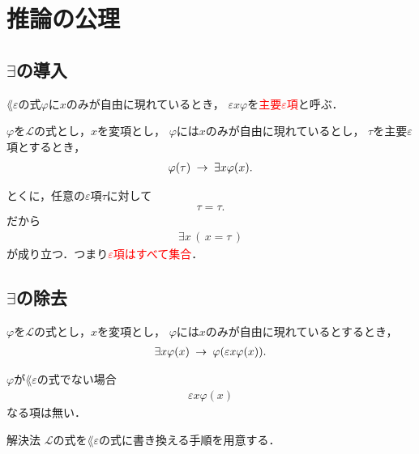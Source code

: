 \section{推論の公理}
\subsection{$\exists$の導入}
	$\lang{\varepsilon}$の式$\varphi$に$x$のみが自由に現れているとき，
	$\varepsilon x \varphi$を\textcolor{red}{主要$\varepsilon$項}と呼ぶ．
	
	\begin{screen}
		\begin{logicalaxm}
			$\varphi$を$\mathcal{L}$の式とし，$x$を変項とし，
			$\varphi$には$x$のみが自由に現れているとし，
			$\tau$を主要$\varepsilon$項とするとき，
			\begin{align}
				\varphi(\tau) \hspace{0.25em}\rightarrow\hspace{0.25em} \exists x \varphi(x).
			\end{align}
		\end{logicalaxm}
	\end{screen}
	
	とくに，任意の$\varepsilon$項$\tau$に対して
	\begin{align}
		\tau = \tau.
	\end{align}
	だから
	\begin{align}
		\exists x\, (\, x = \tau\, )
	\end{align}
	が成り立つ．つまり\textcolor{red}{$\varepsilon$項はすべて集合}．
	
\newpage
\subsection{$\exists$の除去}
	\begin{screen}
		\begin{logicalaxm}
			$\varphi$を$\mathcal{L}$の式とし，$x$を変項とし，
			$\varphi$には$x$のみが自由に現れているとするとき，
			\begin{align}
				\exists x \varphi(x) \hspace{0.25em}\rightarrow\hspace{0.25em} \varphi(\varepsilon x \varphi(x)).
			\end{align}
		\end{logicalaxm}
	\end{screen}
	
	$\varphi$が$\lang{\varepsilon}$の式でない場合
	\begin{align}
		\varepsilon x \varphi(x)
	\end{align}
	なる項は無い．
	
	\begin{itembox}[l]{解決法}
		$\mathcal{L}$の式を$\lang{\varepsilon}$の式に書き換える手順を用意する．
	\end{itembox}

